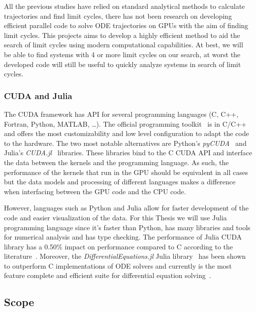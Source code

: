 All the previous studies have relied on standard analytical methods to calculate trajectories and find limit cycles, there has not been research on developing efficient parallel code to solve ODE trajectories on GPUs with the aim of finding limit cycles. This projects aims to develop a highly efficient method to aid the search of limit cycles using modern computational capabilities. At best, we will be able to find systems with 4 or more limit cycles on our search, at worst the developed code will still be useful to quickly analyze systems in search of limit cycles.

\pagebreak
\subsubsection{CUDA and Julia}

The CUDA framework has API for several programming languages (C, C++, Fortran,
Python, MATLAB, \dots). The official programming toolkit~\cite{nvidia_cuda_2021}
is in C/C++ and offers the most customizability and low level configuration to
adapt the code to the hardware. The two most notable alternatives are Python's
\emph{pyCUDA}~\cite{klockner_pycuda_2012} and Julia's
\emph{CUDA.jl}~\cite{besard_effective_2019} libraries. These libraries bind to
the C CUDA API and interface the data between the kernels and the programming
language. As such, the performance of the kernels that run in the GPU should be
equivalent in all cases but the data models and processing of different
languages makes a difference when interfacing between the GPU code and the CPU
code.

However, languages such as Python and Julia allow for faster development of the
code and easier visualization of the data. For this Thesis we will use Julia
programming language since it's faster than Python, has many libraries and tools
for numerical analysis and has type checking. The performance of Julia CUDA
library has a 0.50\% impact on performance compared to C according to the
literature~\cite{besard_effective_2019}. Moreover, the
\emph{DifferentialEquations.jl} Julia
library~\cite{rackauckas_differentialequationsjl_2017} has been shown to
outperform C implementations of ODE solvers and currently is the most feature
complete and efficient suite for differential equation
solving~\cite{rackauckas_comparison_2017}.

\pagebreak
\subsection{Scope}

